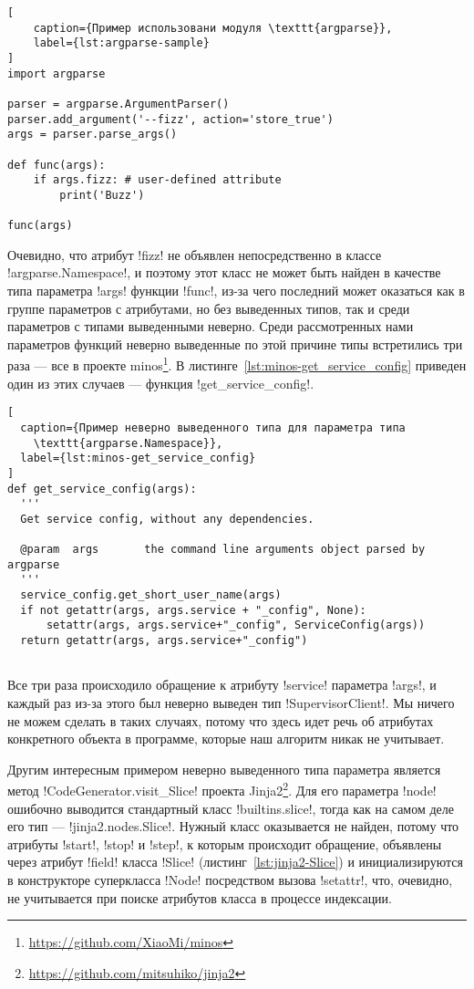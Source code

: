 \begin{lstlisting}[
    caption={Пример использовани модуля \texttt{argparse}},
    label={lst:argparse-sample}
]
import argparse

parser = argparse.ArgumentParser()
parser.add_argument('--fizz', action='store_true')
args = parser.parse_args()

def func(args):
    if args.fizz: # user-defined attribute
        print('Buzz')

func(args)
\end{lstlisting}

Очевидно, что атрибут !fizz! не объявлен непосредственно в классе
!argparse.Namespace!, и поэтому этот класс не может быть найден в качестве типа
параметра !args! функции !func!, из-за чего последний может оказаться как в
группе параметров с атрибутами, но без выведенных типов, так и среди параметров
с типами выведенными неверно. Среди рассмотренных нами параметров функций
неверно выведенные по этой причине типы встретились три раза --- все в проекте
minos\footnote{\url{https://github.com/XiaoMi/minos}}. В
листинге~\ref{lst:minos-get_service_config} приведен один из этих случаев ---
функция !get_service_config!.

\begin{lstlisting}[
  caption={Пример неверно выведенного типа для параметра типа
    \texttt{argparse.Namespace}},
  label={lst:minos-get_service_config}
]
def get_service_config(args):
  '''
  Get service config, without any dependencies.

  @param  args       the command line arguments object parsed by argparse
  '''
  service_config.get_short_user_name(args)
  if not getattr(args, args.service + "_config", None):
      setattr(args, args.service+"_config", ServiceConfig(args))
  return getattr(args, args.service+"_config")
    
\end{lstlisting}

Все три раза происходило обращение к атрибуту !service! параметра !args!, и
каждый раз из-за этого был неверно выведен тип !SupervisorClient!. Мы
ничего не можем сделать в таких случаях, потому что здесь идет речь об атрибутах
конкретного объекта в программе, которые наш алгоритм никак не учитывает.

Другим интересным примером неверно выведенного типа параметра является метод
!CodeGenerator.visit_Slice! проекта
Jinja2\footnote{\url{https://github.com/mitsuhiko/jinja2}}. Для его параметра !node!
ошибочно выводится стандартный класс !builtins.slice!, тогда как на самом деле
его тип --- !jinja2.nodes.Slice!. Нужный класс оказывается не найден, потому что атрибуты
!start!, !stop! и !step!, к которым происходит обращение, объявлены через
атрибут !field! класса !Slice! (листинг~\ref{lst:jinja2-Slice}) и инициализируются в
конструкторе суперкласса !Node! посредством вызова !setattr!, что, очевидно, не
учитывается при поиске атрибутов класса в процессе индексации. 

